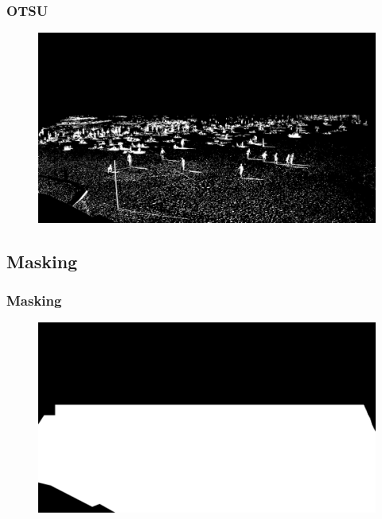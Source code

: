 \documentclass{beamer}
\begin{document}
\begin{frame}
    \frametitle{OTSU }
    \begin{figure}
        \centering
        \includegraphics[width=\textwidth]{../Documentation/img/OTSU_sub_arena.jpg}
    \end{figure}
\end{frame}

\subsection*{Masking}
\begin{frame}
    \frametitle{Masking}
    \begin{figure}
        \centering
        \includegraphics[width=\textwidth]{../mask.png}
    \end{figure}
\end{frame}
\end{document}
